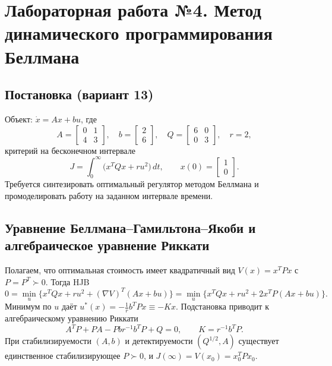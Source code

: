 \chapter{Лабораторная работа №4. Метод динамического программирования Беллмана}

\section*{Постановка (вариант 13)}
Объект: \(\dot x = A x + b u\), где
\[
A=\begin{bmatrix}0&1\\4&3\end{bmatrix},\quad b=\begin{bmatrix}2\\6\end{bmatrix},\quad Q=\begin{bmatrix}6&0\\0&3\end{bmatrix},\quad r=2,
\]
критерий на бесконечном интервале
\[
J=\int_0^{\infty} \big(x^T Q x + r u^2\big)\,dt,\qquad x(0)=\begin{bmatrix}1\\0\end{bmatrix}.
\]
Требуется синтезировать оптимальный регулятор методом Беллмана и промоделировать работу на заданном интервале времени.

\section{Уравнение Беллмана–Гамильтона–Якоби и алгебраическое уравнение Риккати}
Полагаем, что оптимальная стоимость имеет квадратичный вид \(V(x)=x^T P x\) с \(P=P^T\succ0\). Тогда HJB
\[
0=\min_{u}\Big\{ x^T Q x + r u^2 + (\nabla V)^T (A x + b u) \Big\}
=\min_{u}\Big\{ x^T Q x + r u^2 + 2 x^T P (A x + b u) \Big\}.
\]
Минимум по \(u\) даёт \(u^*(x)= -\tfrac{1}{r} b^T P x\equiv -Kx\). Подстановка приводит к алгебраическому уравнению Риккати 
\[
A^T P + P A - P b r^{-1} b^T P + Q = 0,\qquad K=r^{-1} b^T P.
\]
При стабилизируемости \((A,b)\) и детектируемости \((Q^{1/2},A)\) существует единственное стабилизирующее \(P\succ0\), и \(J(\infty)=V(x_0)=x_0^T P x_0\).


